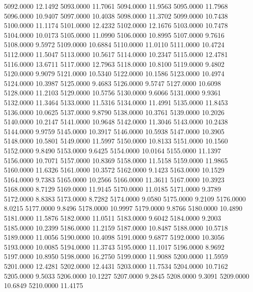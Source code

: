 5092.0000     12.1492
5093.0000     11.7061
5094.0000     11.9563
5095.0000     11.7968
5096.0000     10.9407
5097.0000     10.4038
5098.0000     11.3702
5099.0000     10.7438
5100.0000     11.1174
5101.0000     12.4232
5102.0000     12.1676
5103.0000     10.7478
5104.0000     10.0173
5105.0000     11.0990
5106.0000     10.8995
5107.0000      9.7616
5108.0000      9.5972
5109.0000     10.6884
5110.0000     11.0110
5111.0000     10.4724
5112.0000     11.5047
5113.0000     10.5617
5114.0000     10.2347
5115.0000     12.4781
5116.0000     13.6711
5117.0000     12.7963
5118.0000     10.8100
5119.0000      9.4802
5120.0000      9.9079
5121.0000     10.5340
5122.0000     10.1586
5123.0000     10.4974
5124.0000     10.3987
5125.0000      9.4683
5126.0000      9.5747
5127.0000     10.6098
5128.0000     11.2103
5129.0000     10.5756
5130.0000      9.6066
5131.0000      9.9361
5132.0000     11.3464
5133.0000     11.5316
5134.0000     11.4991
5135.0000     11.8453
5136.0000     10.0625
5137.0000      9.8790
5138.0000     10.3761
5139.0000     10.2026
5140.0000     10.2147
5141.0000     10.9648
5142.0000     11.3046
5143.0000     10.2438
5144.0000      9.9759
5145.0000     10.3917
5146.0000     10.5938
5147.0000     10.3905
5148.0000     10.5801
5149.0000     11.5997
5150.0000     10.8133
5151.0000     10.1560
5152.0000      9.8490
5153.0000      9.6425
5154.0000     10.0164
5155.0000     11.1397
5156.0000     10.7071
5157.0000     10.8369
5158.0000     11.5158
5159.0000     11.9865
5160.0000     11.6326
5161.0000     10.3572
5162.0000      9.1423
5163.0000     10.1529
5164.0000      9.7383
5165.0000     10.2566
5166.0000     11.3611
5167.0000     10.3923
5168.0000      8.7129
5169.0000     11.9145
5170.0000     11.0185
5171.0000      9.3789
5172.0000      8.8383
5173.0000      8.7282
5174.0000      9.0580
5175.0000      9.2109
5176.0000      8.0215
5177.0000      9.8496
5178.0000     10.9997
5179.0000      9.8766
5180.0000     10.4890
5181.0000     11.5876
5182.0000     11.0511
5183.0000      9.6042
5184.0000      9.2003
5185.0000     10.2399
5186.0000     11.2159
5187.0000     10.8487
5188.0000     10.5718
5189.0000     11.0056
5190.0000     10.4098
5191.0000      9.6877
5192.0000     10.3056
5193.0000     10.0085
5194.0000     11.3743
5195.0000     11.1017
5196.0000      8.9692
5197.0000     10.8950
5198.0000     16.2750
5199.0000     11.9088
5200.0000     11.5959
5201.0000     12.4281
5202.0000     12.4431
5203.0000     11.7534
5204.0000     10.7162
5205.0000      9.5033
5206.0000     10.1227
5207.0000      9.2845
5208.0000      9.3091
5209.0000     10.6849
5210.0000     11.4175
